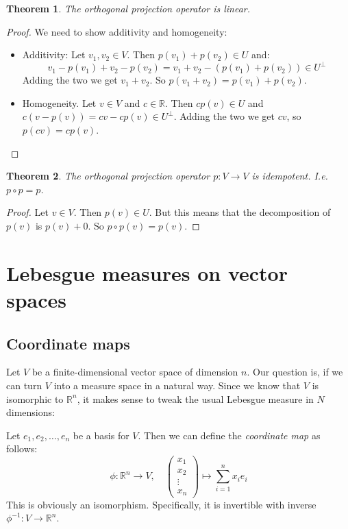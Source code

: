 \documentclass[12pt, a4paper]{article}
\newtheorem{theorem}{Theorem}[section]
\numberwithin{equation}{section}
\begin{document}
\begin{theorem}
The orthogonal projection operator is linear.
\end{theorem}
\begin{proof}
We need to show additivity and homogeneity:
\begin{itemize}
\item Additivity: Let $v_1,v_2\in V$. Then $p(v_1)+p(v_2)\in U$ and:
\begin{equation}
v_1-p(v_1)+v_2-p(v_2)=v_1+v_2-(p(v_1)+p(v_2))\in U^\perp
\end{equation}
Adding the two we get $v_1+v_2$. So $p(v_1+v_2)=p(v_1)+p(v_2)$.
\item Homogeneity. Let $v\in V$ and $c\in\mathbb{R}$. Then $cp(v)\in U$ and $c(v-p(v))=cv-cp(v)\in U^\perp$. Adding the two we get $cv$, so $p(cv)=cp(v)$. 
\end{itemize}
\end{proof}

\begin{theorem}
The orthogonal projection operator $p:V\rightarrow V$ is idempotent. I.e. $p\circ p=p$.
\end{theorem}
\begin{proof}
Let $v\in V$. Then $p(v)\in U$. But this means that the decomposition of $p(v)$ is $p(v)+0$. So $p\circ p(v)=p(v)$.
\end{proof}

\section{Lebesgue measures on vector spaces}

\subsection{Coordinate maps}
Let $V$ be a finite-dimensional vector space of dimension $n$. Our question is, if we can turn $V$ into a measure space in a natural way. Since we know that $V$ is isomorphic to $\mathbb{R}^n$, it makes sense to tweak the usual Lebesgue measure in $N$ dimensions:

Let $e_1,e_2,\ldots,e_n$ be a basis for $V$. Then we can define the \textit{coordinate map} as follows:
\begin{equation}
\phi:\mathbb{R}^n\rightarrow V,\quad
\begin{pmatrix}
x_1	\\	x_2	\\ \vdots	\\ x_n
\end{pmatrix}
\mapsto\sum_{i=1}^n x_i e_i
\end{equation}
This is obviously an isomorphism. Specifically, it is invertible with inverse $\phi^{-1}: V\rightarrow\mathbb{R}^n$.
\end{document}
